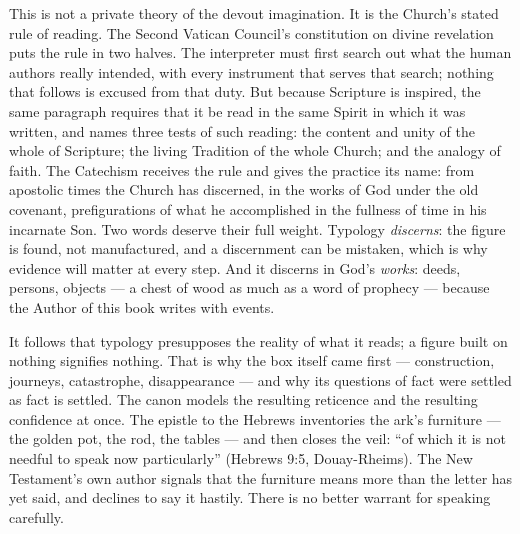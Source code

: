 This is not a private theory of the devout imagination. It is the Church's
stated rule of reading. The Second Vatican Council's constitution on
divine revelation puts the rule in two halves. The interpreter must first search out what the
human authors really intended, with every instrument that serves that
search; nothing that follows is excused from that duty. But because
Scripture is inspired, the same paragraph requires that it be read in the
same Spirit in which it was written, and names three tests of such
reading: the content and unity of the whole of Scripture; the living
Tradition of the whole Church; and the analogy of faith. The Catechism
receives the rule and gives the practice its name: from apostolic times
the Church has discerned, in the works of God under the old covenant,
prefigurations of what he accomplished in the fullness of time in his
incarnate Son. Two words deserve their full weight. Typology
\emph{discerns}: the figure is found, not manufactured, and a discernment
can be mistaken, which is why evidence will matter at every step. And it
discerns in God's \emph{works}: deeds, persons, objects --- a chest of
wood as much as a word of prophecy --- because the Author of this book
writes with events.

It follows that typology presupposes the reality of what it reads; a
figure built on nothing signifies nothing. That is why the box itself came
first --- construction, journeys, catastrophe, disappearance --- and why
its questions of fact were settled as fact is settled. The canon models
the resulting reticence and the resulting confidence at once. The epistle
to the Hebrews inventories the ark's furniture --- the golden pot, the
rod, the tables --- and then closes the veil: ``of which it is not needful
to speak now particularly'' (Hebrews 9:5,
Douay-Rheims). The New Testament's own author signals that the furniture
means more than the letter has yet said, and declines to say it hastily.
There is no better warrant for speaking carefully.

